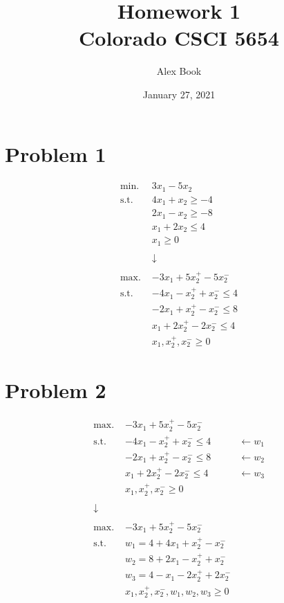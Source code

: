 \documentclass[12pt]{article}
\begin{document}
\title{Homework 1 \\
       Colorado CSCI 5654}
\author{Alex Book}
\date{January 27, 2021}
\maketitle


\section*{Problem 1}
\begin{align*}
\text{min. } &3x_1 - 5x_2 \\
\text{s.t. } &4x_1 + x_2 \geq -4 \\
&2x_1 - x_2 \geq -8 \\
&x_1 + 2x_2 \leq 4 \\
&x_1 \geq 0 \\
\\
&\downarrow \\
\\
\text{max. } &-3x_1 + 5x_2^+ - 5x_2^- \\
\text{s.t. } &-4x_1 - x_2^+ + x_2^- \leq 4 \\
& -2x_1 + x_2^+ - x_2^- \leq 8 \\
& x_1 + 2x_2^+ - 2x_2^- \leq 4 \\
& x_1, x_2^+, x_2^- \geq 0
\end{align*}

\newpage
\section*{Problem 2}
\begin{align*}
\text{max. } &-3x_1 + 5x_2^+ - 5x_2^- \\
\text{s.t. } &-4x_1 - x_2^+ + x_2^- \leq 4 &\leftarrow w_1 \\
& -2x_1 + x_2^+ - x_2^- \leq 8 &\leftarrow w_2 \\
& x_1 + 2x_2^+ - 2x_2^- \leq 4 &\leftarrow w_3 \\
& x_1, x_2^+, x_2^- \geq 0 \\
\\
\downarrow \\
\\
\text{max. } &-3x_1 + 5x_2^+ - 5x_2^- \\
\text{s.t. } &w_1 = 4 + 4x_1 + x_2^+ - x_2^- \\
&w_2 = 8 + 2x_1 - x_2^+ + x_2^- \\
&w_3 = 4 - x_1 - 2x_2^+ + 2x_2^- \\
& x_1, x_2^+, x_2^-, w_1, w_2, w_3 \geq 0 \\
\end{align*}
\end{document}
